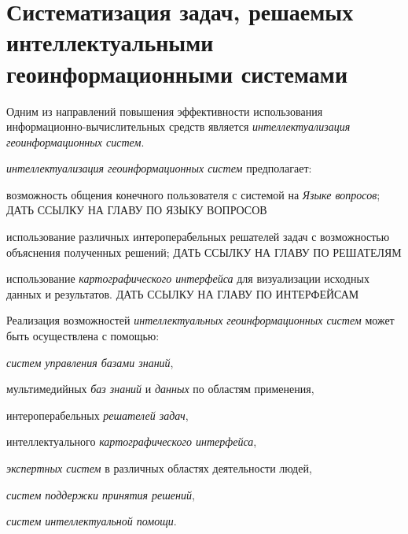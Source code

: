 
\section{Систематизация задач, решаемых интеллектуальными геоинформационными системами}
\label{chapter_gis_sec_tasks}

Одним из направлений повышения эффективности использования информационно-вычислительных средств является \textit{интеллектуализация геоинформационных систем}.

\textit{интеллектуализация геоинформационных систем} предполагает:
\begin{textitemize}
	\item возможность общения конечного пользователя с системой на \textit{Языке вопросов}; ДАТЬ ССЫЛКУ НА ГЛАВУ ПО ЯЗЫКУ ВОПРОСОВ
	\item использование различных интероперабельных решателей задач с возможностью объяснения полученных решений; ДАТЬ ССЫЛКУ НА ГЛАВУ ПО РЕШАТЕЛЯМ 
	\item использование \textit{картографического интерфейса} для визуализации исходных данных и результатов. ДАТЬ ССЫЛКУ НА ГЛАВУ ПО ИНТЕРФЕЙСАМ
\end{textitemize}
	
Реализация возможностей \textit{интеллектуальных геоинформационных систем} может быть осуществлена с помощью:
\begin{textitemize}
	\item \textit{систем управления базами знаний},
	\item мультимедийных \textit{баз знаний} и \textit{данных} по областям применения,
	\item интероперабельных \textit{решателей задач},
	\item интеллектуального \textit{картографического интерфейса},
	\item \textit{экспертных систем} в различных областях деятельности людей,
	\item \textit{систем поддержки принятия решений},
	\item \textit{систем интеллектуальной помощи}.
\end{textitemize}

